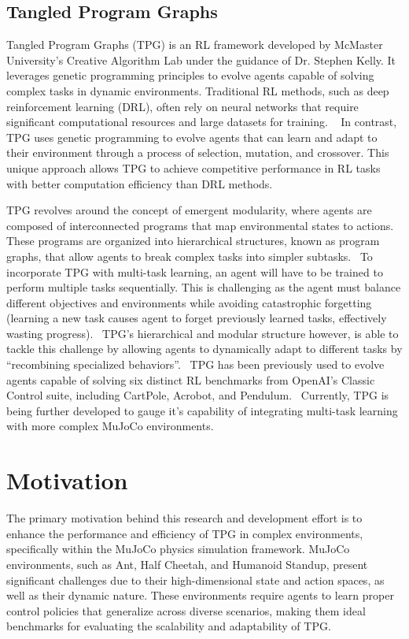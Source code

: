 \documentclass[sigconf]{acmart}
\begin{document}
\subsection{Tangled Program Graphs}
Tangled Program Graphs (TPG) is an RL framework developed by McMaster University’s Creative Algorithm Lab under the guidance of Dr. Stephen Kelly.
It leverages genetic programming principles to evolve agents capable of solving complex tasks in dynamic environments. Traditional RL methods,
such as deep reinforcement learning (DRL), often rely on neural networks that require significant computational resources and large datasets for training.
~\cite{Winkler2025}  In contrast, TPG uses genetic programming to evolve agents that can learn and adapt to their environment through a process of 
selection, mutation, and crossover. This unique approach allows TPG to achieve competitive performance in RL tasks with better computation
efficiency than DRL methods.~\cite{Winkler2025}

TPG revolves around the concept of emergent modularity, where agents are composed of interconnected programs that map environmental states to actions.
These programs are organized into hierarchical structures, known as program graphs, that allow agents to break complex tasks into simpler subtasks.~\cite{Kelly21} To incorporate TPG with multi-task learning, an agent will have to be trained to perform multiple tasks sequentially.
This is challenging as the agent must balance different objectives and environments while  avoiding catastrophic forgetting
(learning a new task causes agent to forget previously learned tasks, effectively wasting progress).~\cite{Kelly21} TPG’s
hierarchical and modular structure however, is able to tackle this challenge by allowing agents to dynamically adapt to different tasks by 
“recombining specialized behaviors”.~\cite{Kelly21} TPG has been previously used to evolve agents capable of solving six distinct RL benchmarks from OpenAI’s
Classic Control suite, including CartPole, Acrobot, and Pendulum.~\cite{Kelly21} Currently, TPG is being further developed to gauge it’s
capability of integrating multi-task learning with more complex MuJoCo environments.

\section{Motivation}
The primary motivation behind this research and development effort is to enhance the performance and efficiency of TPG in complex environments, specifically within the MuJoCo physics simulation framework. MuJoCo environments, such as Ant, Half Cheetah, and Humanoid Standup, present significant challenges due to their high-dimensional state and action spaces, as well as their dynamic nature. These environments require agents to learn proper control policies that generalize across diverse scenarios, making them ideal benchmarks for evaluating the scalability and adaptability of TPG.
\end{document}
